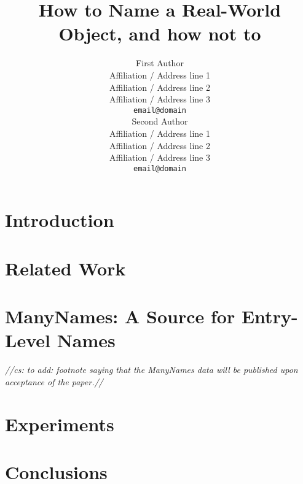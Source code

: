 \documentclass[11pt,a4paper]{article}
\title{How to Name a Real-World Object, and how not to}
\author{First Author \\
  Affiliation / Address line 1 \\
  Affiliation / Address line 2 \\
  Affiliation / Address line 3 \\
  \texttt{email@domain} \\\And
  Second Author \\
  Affiliation / Address line 1 \\
  Affiliation / Address line 2 \\
  Affiliation / Address line 3 \\
  \texttt{email@domain} \\}
\date{}
\newcommand{\cs}[1]{\textcolor{green!60!black}{\emph{//cs: #1//}}}
\newcommand{\mn}{ManyNames\xspace}
\begin{document}
\maketitle
\begin{abstract}

\end{abstract}

\section{Introduction}
\label{sec:intro}


\section{Related Work}
\label{sec:related}


\section{ManyNames: A Source for Entry-Level Names}
\label{sec:manynames}
\cs{to add: footnote saying that the \mn data will be published upon acceptance of the paper.}



\section{Experiments}
\label{sec:experiments}


\section{Conclusions}
\label{sec:conclusions}

%
%

%

\end{document}
